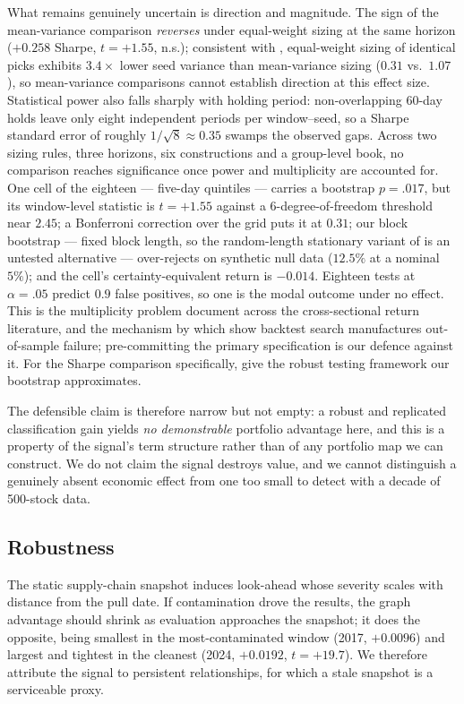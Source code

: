 What remains genuinely uncertain is direction and magnitude. The sign of the
mean-variance comparison \emph{reverses} under equal-weight sizing at the
same horizon ($+0.258$ Sharpe, $t=+1.55$, n.s.); consistent with
\citet{michaud1989markowitz}, equal-weight sizing of identical picks
exhibits $3.4\times$ lower seed variance than mean-variance sizing
($0.31$ vs.\ $1.07$), so mean-variance comparisons cannot establish
direction at this effect size. Statistical power also falls sharply with
holding period: non-overlapping 60-day holds leave only eight independent
periods per window--seed, so a Sharpe standard error of roughly
$1/\sqrt{8} \approx 0.35$ swamps the observed gaps. Across two sizing rules,
three horizons, six constructions and a group-level book, no comparison
reaches significance once power and multiplicity are accounted for. One cell
of the eighteen --- five-day quintiles --- carries a bootstrap $p=.017$, but
its window-level statistic is $t=+1.55$ against a $6$-degree-of-freedom
threshold near $2.45$; a Bonferroni correction over the grid puts it at
$0.31$; our block bootstrap --- fixed block length, so the
random-length stationary variant of \citet{politis1994stationary} is an
untested alternative --- over-rejects on synthetic null data
($12.5\%$ at a nominal $5\%$); and the cell's certainty-equivalent return is
$-0.014$. Eighteen tests at $\alpha=.05$ predict $0.9$ false positives, so
one is the modal outcome under no effect. This is the multiplicity problem
\citet{harvey2016cross} document across the cross-sectional return
literature, and the mechanism by which \citet{bailey2014pseudo} show backtest
search manufactures out-of-sample failure; pre-committing the primary
specification is our defence against it. For the Sharpe comparison
specifically, \citet{ledoit2008robust} give the robust testing framework our
bootstrap approximates.

The defensible claim is therefore narrow but not empty: a robust and
replicated classification gain yields \emph{no demonstrable} portfolio
advantage here, and this is a property of the signal's term structure rather
than of any portfolio map we can construct. We do not claim the signal
destroys value, and we cannot distinguish a genuinely absent economic effect
from one too small to detect with a decade of 500-stock data.

\subsection{Robustness}
\label{sec:robust}
The static supply-chain snapshot induces look-ahead whose severity scales
with distance from the pull date. If contamination drove the results, the
graph advantage should shrink as evaluation approaches the snapshot; it does
the opposite, being smallest in the most-contaminated window (2017,
$+0.0096$) and largest and tightest in the cleanest (2024, $+0.0192$,
$t=+19.7$). We therefore attribute the signal to persistent relationships,
for which a stale snapshot is a serviceable proxy.

